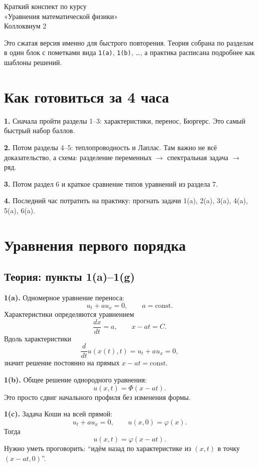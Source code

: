 \documentclass[a4paper,12pt]{article}
\begin{document}
\begin{center}
{\LARGE Краткий конспект по курсу}\\[0.2em]
{\LARGE «Уравнения математической физики»}\\[0.6em]
{\large Коллоквиум 2}
\end{center}

\vspace{0.4em}
Это сжатая версия именно для быстрого повторения. Теория собрана по разделам в один блок с пометками вида \texttt{1(a)}, \texttt{1(b)}, \dots, а практика расписана подробнее как шаблоны решений.

\section*{Как готовиться за 4 часа}

\textbf{1.} Сначала пройти разделы 1--3: характеристики, перенос, Бюргерс. Это самый быстрый набор баллов.

\textbf{2.} Потом разделы 4--5: теплопроводность и Лаплас. Там важно не всё доказательство, а схема: разделение переменных $\to$ спектральная задача $\to$ ряд.

\textbf{3.} Потом раздел 6 и краткое сравнение типов уравнений из раздела 7.

\textbf{4.} Последний час потратить на практику: прогнать задачи 1(a), 2(a), 3(a), 4(a), 5(a), 6(a).

\tableofcontents
\newpage

\section{Уравнения первого порядка}

\subsection{Теория: пункты 1(a)--1(g)}

\textbf{1(a).} Одномерное уравнение переноса:
\[
u_t+a u_x=0,
\qquad a=\mathrm{const}.
\]
Характеристики определяются уравнением
\[
\frac{dx}{dt}=a,
\qquad x-at=C.
\]
Вдоль характеристики
\[
\frac{d}{dt}u(x(t),t)=u_t+a u_x=0,
\]
значит решение постоянно на прямых $x-at=\mathrm{const}$.

\textbf{1(b).} Общее решение однородного уравнения:
\[
u(x,t)=\Phi(x-at).
\]
Это просто сдвиг начального профиля без изменения формы.

\textbf{1(c).} Задача Коши на всей прямой:
\[
u_t+a u_x=0,
\qquad u(x,0)=\varphi(x).
\]
Тогда
\[
u(x,t)=\varphi(x-at).
\]
Нужно уметь проговорить: ``идём назад по характеристике из $(x,t)$ в точку $(x-at,0)$''.
\end{document}
